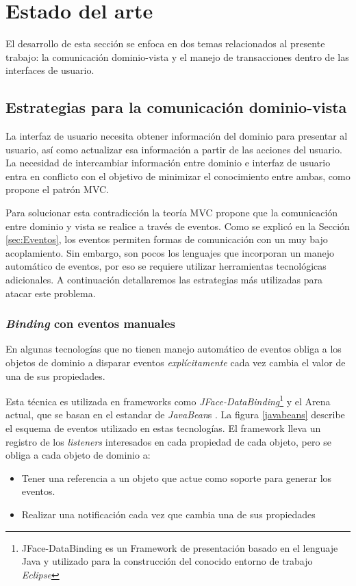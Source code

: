\section{Estado del arte}
\label{sec:StateOfTheArt}
El desarrollo de esta sección se enfoca en dos temas relacionados al
presente trabajo: la comunicación dominio-vista y el manejo de transacciones
dentro de las interfaces de usuario.

\subsection{Estrategias para la comunicación dominio-vista}
La interfaz de usuario necesita obtener información del dominio para presentar
al usuario, así como actualizar esa información a partir de las acciones del usuario.
La necesidad de intercambiar información entre dominio e interfaz de usuario
entra en conflicto con el objetivo de minimizar el conocimiento entre ambas,
como propone el patrón MVC.

Para solucionar esta contradicción la teoría MVC propone que la
comunicación entre dominio y vista se realice a través de eventos. 
Como se explicó en la Sección \ref{sec:Eventos}, los eventos
permiten formas de comunicación con un muy bajo acoplamiento. 
Sin embargo, son pocos los lenguajes que incorporan un manejo automático de
eventos, por eso se requiere utilizar herramientas tecnológicas adicionales.
A continuación detallaremos las estrategias más utilizadas para atacar este problema.

\subsubsection{\emph{Binding} con eventos manuales}
	En algunas tecnologías que no tienen manejo automático de eventos obliga a
	los objetos de dominio a disparar eventos \emph{explícitamente} cada vez cambia
	el valor de una de sus propiedades.
	
	Esta técnica es utilizada en
	frameworks como \emph{JFace-DataBinding}\footnote{JFace-DataBinding es un
	Framework de presentación basado en el lenguaje Java y utilizado para la
	construcción del conocido entorno de trabajo \emph{Eclipse}} y el Arena
	actual, que se basan en el estandar de
	\emph{JavaBean}s \cite{sousa00formal}.
	La figura \ref{javabeans} describe el esquema de eventos utilizado en estas
	tecnologías. El framework lleva un registro de los \emph{listeners}
	interesados en cada propiedad de cada objeto, pero se obliga a cada objeto de dominio a:
	\begin{itemize}
	  \item Tener una referencia a un objeto que actue como soporte para generar
	  los eventos.
	  \item Realizar una notificación cada vez que cambia una de sus propiedades
	\end{itemize} 

